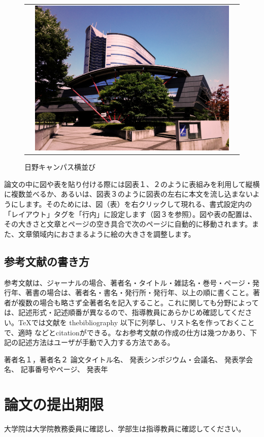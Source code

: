 \documentclass[a4paper]{jsarticle}
\begin{document}
\begin{figure}[tb]
\begin{center}
\begin{tabular}{ccc}
    &
    \begin{minipage}{0.3\hsize}
      \includegraphics[width=\hsize]{./images/sample.jpg}
    \end{minipage}

  \end{tabular}
    \caption{日野キャンパス横並び}
    \label{fig:tmu_hino_yokonarabi}
  \end{center}
\end{figure}


論文の中に図や表を貼り付ける際には図表１、２のように表組みを利用して縦横に複数並べるか、あるいは、図表３のように図表の左右に本文を流し込まないようにします。そのためには、図（表）を右クリックして現れる、書式設定内の「レイアウト」タグを「行内」に設定します（図３を参照）。図や表の配置は、その大きさと文章とページの空き具合で次のページに自動的に移動されます。また、文章領域内におさまるように絵の大きさを調整します。

\subsection{参考文献の書き方}
参考文献は、ジャーナルの場合、著者名・タイトル・雑誌名・巻号・ページ・発行年、著書の場合は、著者名・書名・発行所・発行年、以上の順に書くこと。著者が複数の場合も略さず全著者名を記入すること。これに関しても分野によっては、記述形式・記述順番が異なるので、指導教員にあらかじめ確認してください。\TeX では文献を thebibliography 以下に列挙し、リスト名を作っておくことで、適時\cite{sample} などとcitationができる。なお参考文献の作成の仕方は幾つかあり、下記の記述方法はユーザが手動で入力する方法である。

\begin{thebibliography}{999}
  著者名１，著者名２
  論文タイトル名、
  発表シンポジウム・会議名、
  発表学会名、
  記事番号やページ、
  発表年

\end{thebibliography}

\section*{論文の提出期限}
大学院は大学院教務委員に確認し、学部生は指導教員に確認してください。
\end{document}

